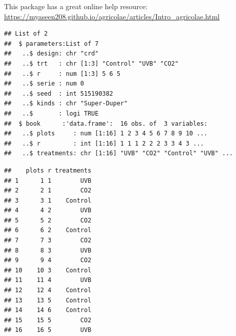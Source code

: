\documentclass[
]{book}
\newenvironment{Shaded}{\begin{snugshade}}{\end{snugshade}}
\newcommand{\AttributeTok}[1]{\textcolor[rgb]{0.77,0.63,0.00}{#1}}
\newcommand{\CommentTok}[1]{\textcolor[rgb]{0.56,0.35,0.01}{\textit{#1}}}
\newcommand{\DecValTok}[1]{\textcolor[rgb]{0.00,0.00,0.81}{#1}}
\newcommand{\FunctionTok}[1]{\textcolor[rgb]{0.00,0.00,0.00}{#1}}
\newcommand{\NormalTok}[1]{#1}
\newcommand{\OtherTok}[1]{\textcolor[rgb]{0.56,0.35,0.01}{#1}}
\newcommand{\SpecialCharTok}[1]{\textcolor[rgb]{0.00,0.00,0.00}{#1}}
\newcommand{\StringTok}[1]{\textcolor[rgb]{0.31,0.60,0.02}{#1}}
\begin{document}
This package has a great online help resource: \url{https://myaseen208.github.io/agricolae/articles/Intro_agricolae.html}

\begin{Shaded}
\end{Shaded}

\begin{verbatim}
## List of 2
##  $ parameters:List of 7
##   ..$ design: chr "crd"
##   ..$ trt   : chr [1:3] "Control" "UVB" "CO2"
##   ..$ r     : num [1:3] 5 6 5
##   ..$ serie : num 0
##   ..$ seed  : int 515190382
##   ..$ kinds : chr "Super-Duper"
##   ..$       : logi TRUE
##  $ book      :'data.frame':  16 obs. of  3 variables:
##   ..$ plots     : num [1:16] 1 2 3 4 5 6 7 8 9 10 ...
##   ..$ r         : int [1:16] 1 1 1 2 2 2 3 3 4 3 ...
##   ..$ treatments: chr [1:16] "UVB" "CO2" "Control" "UVB" ...
\end{verbatim}

\begin{Shaded}
\end{Shaded}

\begin{verbatim}
##    plots r treatments
## 1      1 1        UVB
## 2      2 1        CO2
## 3      3 1    Control
## 4      4 2        UVB
## 5      5 2        CO2
## 6      6 2    Control
## 7      7 3        CO2
## 8      8 3        UVB
## 9      9 4        CO2
## 10    10 3    Control
## 11    11 4        UVB
## 12    12 4    Control
## 13    13 5    Control
## 14    14 6    Control
## 15    15 5        CO2
## 16    16 5        UVB
\end{verbatim}
\end{document}
